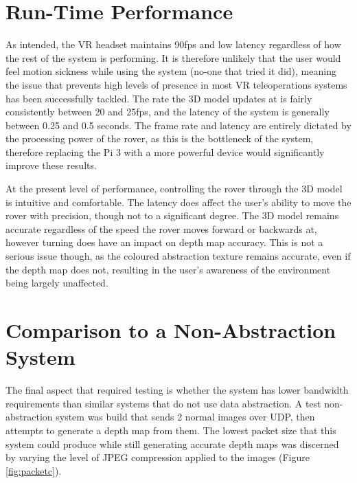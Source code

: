 \section{Run-Time Performance}

As intended, the VR headset maintains 90fps and low latency regardless of how the rest of the system is performing. It is therefore unlikely that the user would feel motion sickness while using the system (no-one that tried it did), meaning the issue that prevents high levels of presence in most VR teleoperations systems has been successfully tackled. The rate the 3D model updates at is fairly consistently between 20 and 25fps, and the latency of the system is generally between 0.25 and 0.5 seconds. The frame rate and latency are entirely dictated by the processing power of the rover, as this is the bottleneck of the system, therefore replacing the Pi 3 with a more powerful device would significantly improve these results.

At the present level of performance, controlling the rover through the 3D model is intuitive and comfortable. The latency does affect the user's ability to move the rover with precision, though not to a significant degree. The 3D model remains accurate regardless of the speed the rover moves forward or backwards at, however turning does have an impact on depth map accuracy. This is not a serious issue though, as the coloured abstraction texture remains accurate, even if the depth map does not, resulting in the user's awareness of the environment being largely unaffected.

\section{Comparison to a Non-Abstraction System}

The final aspect that required testing is whether the system has lower bandwidth requirements than similar systems that do not use data abstraction. A test non-abstraction system was build that sends 2 normal images over UDP, then attempts to generate a depth map from them. The lowest packet size that this system could produce while still generating accurate depth maps was discerned by varying the level of JPEG compression applied to the images (Figure \ref{fig:packetc}).

